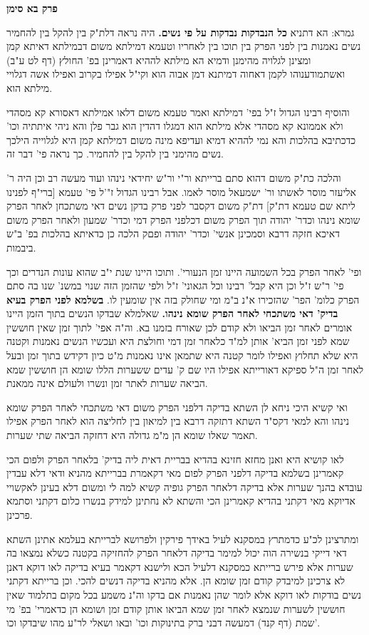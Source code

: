 \documentclass[12pt, openany]{book}
\newcommand{\sethebfont}{
\fontsize{10.5pt}{21.0pt} \selectfont
}
\newcommand{\twocol}[1]{
	{\sethebfont \begin{multicols}{2}
			#1
	\end{multicols}}	
}
\newcommand{\chapname}{}
\newcommand{\newchap}[1]{
	\addcontentsline{toc}{chapter}{#1}
	\renewcommand{\chapname}{#1}
		\begin{center}
			\textbf{%
\fontsize{16pt}{16pt}\selectfont
				#1}
		\end{center}
}
\begin{document}
\newchap{פרק \quad בא סימן}
\twocol{
גמרא: הא דתניא \textbf{כל הנבדקות נבדקות על פי נשים.}  היה נראה דלת"ק בין להקל בין להחמיר נשים נאמנות בין לפני הפרק בין תוכו בין לאחריו וטעמא דמילתא משום דבמילתא דאיתא קמן ומצינן לגלויה מהימנן ודמיא הא מילתא לההיא דאמרינן בפ' החולץ (דף לט ע"ב) ואשתמודענוהו לקמן דאחוה דמיתנא דמן אבוה הוא וקי"ל אפילו בקרוב ואפילו אשה דגלויי מילתא הוא.\par והוסיף רבינו הגדול ז"ל בפי' דמילתא ואמר טעמא משום דלאו אמילתא דאסורא קא מסהדי ולא אממונא קא מסהדי אלא מילתא הוא דמגלו דהדין הוא גבר פלן והא ניהי איתתיה וכו' כדכתיבא בהלכות והא נמי לההיא דמיא ועדיפא מינה משום דמילתא קמן היא לגלוייה הילכך נשים מהימני בין להקל בין להחמיר. כך נראה פי' דבר זה.\par  והלכה כת"ק משום דהוא סתם ברייתא ור"י ור"ש יחידאי נינהו ועוד מעשה רב וכן היה ר' אליעזר מוסר לאשתו ור' ישמעאל מוסר לאמו. אבל רבינו הגדול ז"'ל פי' טעמא {\small [ברי"ף לפנינו ליתא שם טעמא דת"ק]}  דת"ק משום דקסבר לפני פרק בדקן נשים דאי משתכחן לאחר הפרק שומא נינהו וכדר' יהודה תוך הפרק משום דכלפני הפרק דמי וכדר' שמעון ולאחר הפרק משום דאיכא חזקה דרבא וסמכינן אנשי' וכדר' יהודה ופםק הלכה כן כדאיתא בהלכות בפ' ב"ש ביבמות.\par  ופי' לאחר הפרק בכל השמועה היינו זמן הנעורי'. ותוכו היינו שנת י"ב שהוא עונות הנדרים וכך פי' ר"ש ז"ל וכן היא קבל' רבינו וכל הגאוני' ז"ל ולפי שהזמן הזה שנוי במשנ' שנו בה סתם הפרק כלומ' הפר' שהזכירו א"נ ב"מ ומי שחולק בזה אין שומעין לו. 
\textbf{בשלמא לפני הפרק בעיא בדיק' דאי משתכחי לאחר הפרק שומא נינהו.}  שאלמלא שבדקו הנשים בתוך הזמן היינו אומרים לאחר זמן הביאו ולא קודם לכן שאורח בזמנו בא. וה"ה אפי' לתוך זמן שאין חוששין שמא לפני זמן הביא' אותן למ"ד כלאחר זמן דמי וחולצת היא ועכשיו הנשים נאמנות וקטנה היא שלא תחלוץ ואפילו לומר קטנה היא שתמאן אינו נאמנות מ"ט כיון דקידש בתוך זמן ובעל לאחר זמן ה"ל ספיקא דאורייתא אפילו היו שם ק' עדים ששערות הללו שומא הן חוששין שמא הביאה שערות לאתר זמן ונשרו ולעולם אינה ממאנת.\par ואי קשיא היכי ניחא לן השתא בדיקה דלפני הפרק משום דאי משתכחי לאחר הפרק שומא נינהו והא למאי דקס"ד השתא דתזקה דרבא בין למיאון בין לחליצה הוא לאחר הפרק אפילו תאמר שאלו שומא הן מ"מ גדולה היא דחזקה הביאה שתי שערות.\par  לאו קושיא היא ואנן מחזא חזינא בהדיא בבריית דאית ליה בדיק' בלאחר הפרק ולפום הכי קאמרינן בשלמא בדיקה דלפני הפרק לפום מאי דקאמרת בברייתא מהניא ודאי דלא עבדין עובדא בהנך שערות אלא בדיקה דלאחר הפרק גופיה קשיא למה לי ומשום דלא בעינן לאקשויי אדיוקא מאי דקתני בהדיא קאמרינן הכי והשתא לא נחתינן למידק בנשרו כלום דקתני וסתמא פרכינן.\par  ומתרצינן לכ"ע כדמתרץ במסקנא לעיל באידך פירקין ולפרושא לברייתא בעלמא אתינן השתא דאי דייקי בנשירה הוה יכול למימר בדיקה דלאחר הפרק להחזיקה בקטנה כשלא נמצאו בה שערות אלא פירש ברייתא כמסקנא דלעיל הכא ולישנא דקאמר בעיא בדיקה לאו דוקא דאנן לא צרכינן למיבדק קודם זמן שומא הן. אלא מהניא בדיקה דנשים להכי. וכן ברייתא דקתני נשים בודקות לאו דוקא אלא לומר שהן נאמנות אם בדקו וה"נ משמע בכל מקום בתלמוד שאין חוששין לשערות שנמצא לאחר זמן שמא הביאו אותן קודם זמן ושומא הן כדאמרי' בפ' מי שמת (דף קנד) דמעשה דבני ברק בתינוקות וכו' ובאו ושאלי לר"ע מהו שיבדקו וכו'. 
}
\end{document}
